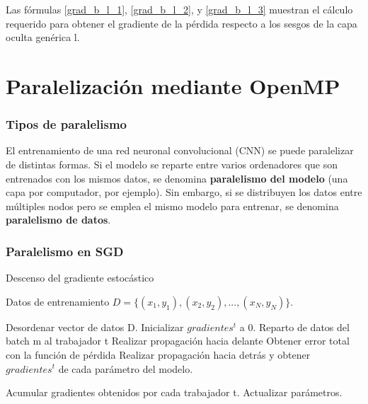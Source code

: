 Las fórmulas \ref{grad_b_l_1}, \ref{grad_b_l_2}, y \ref{grad_b_l_3} muestran el cálculo requerido para obtener el gradiente de la pérdida respecto a los sesgos de la capa oculta genérica l.

\section{Paralelización mediante OpenMP}

\subsubsection{Tipos de paralelismo}

El entrenamiento de una red neuronal convolucional (CNN) se puede paralelizar de distintas formas. Si el modelo se reparte entre varios ordenadores que son entrenados con los mismos datos, se denomina \textbf{paralelismo del modelo} (una capa por computador, por ejemplo). Sin embargo, si se distribuyen los datos entre múltiples nodos pero se emplea el mismo modelo para entrenar, se denomina \textbf{paralelismo de datos}. \\

\subsubsection{Paralelismo en SGD}
\begin{algorithm}[H]
	\caption{Descenso del gradiente estocástico} 
	\begin{algorithmic}
		\State Datos de entrenamiento $D=\{(x_1, y_1), (x_2, y_2), ..., (x_N, y_N)\}$.
		
			\State Desordenar vector de datos D.
					\State Inicializar $gradientes^t$ a 0.
					\State Reparto de datos del batch m al trabajador t
					\State Realizar propagación hacia delante
					\State Obtener error total con la función de pérdida
					\State Realizar propagación hacia detrás y obtener $gradientes^t$ 
					\State de cada parámetro del modelo.
					
					\State Acumular gradientes obtenidos por cada trabajador t.
					\State Actualizar parámetros.
					
				\EndFor
			\EndFor
		\EndFor
	\end{algorithmic}
\end{algorithm}

